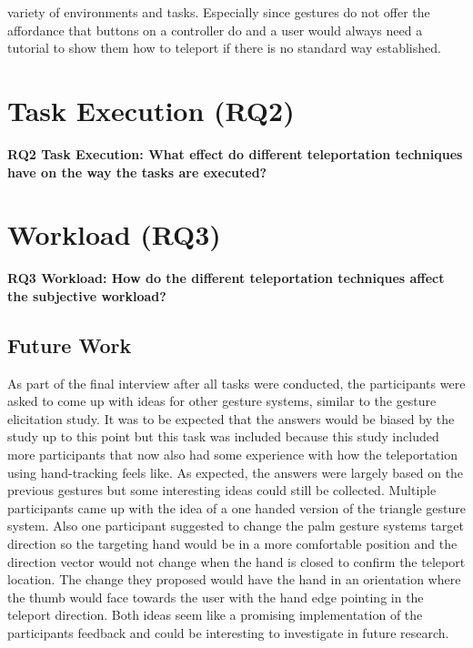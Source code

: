 variety of environments and tasks. Especially since gestures do not offer the affordance that buttons on a controller do and a user would always need a tutorial to show them how to teleport if there is no standard way established. 


\section{Task Execution (RQ2)}
\textbf{RQ2 Task Execution: What effect do different teleportation techniques have on the way the tasks are executed?}

\section{Workload (RQ3)}
\textbf{RQ3 Workload: How do the different teleportation techniques affect the subjective workload?}



\subsection{Future Work}

As part of the final interview after all tasks were conducted, the participants were asked to come up with ideas for other gesture systems, similar to the gesture elicitation study. It was to be expected that the answers would be biased by the study up to this point but this task was included because this study included more participants that now also had some experience with how the teleportation using hand-tracking feels like. As expected, the answers were largely based on the previous gestures but some interesting ideas could still be collected. Multiple participants came up with the idea of a one handed version of the triangle gesture system. Also one participant suggested to change the palm gesture systems target direction so the targeting hand would be in a more comfortable position and the direction vector would not change when the hand is closed to confirm the teleport location. The change they proposed would have the hand in an orientation where the thumb would face towards the user with the hand edge pointing in the teleport direction. Both ideas seem like a promising implementation of the participants feedback and could be interesting to investigate in future research.

